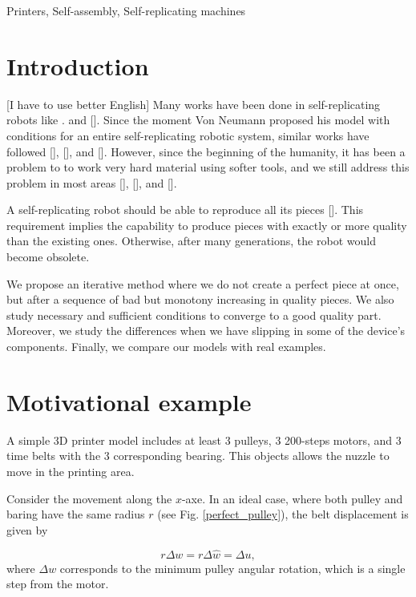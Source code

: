 \documentclass[conference]{IEEEtran}
\begin{document}
\begin{IEEEkeywords}
Printers, Self-assembly, Self-replicating machines
\end{IEEEkeywords}

\section{Introduction}

{\color{red}[I have to use better English]} Many works have been done in self-replicating robots like \cite{b1}. and []. Since the moment Von Neumann proposed his model with conditions for an entire self-replicating robotic system, similar works have followed [], [], and []. However, since the beginning of the humanity, it has been a problem  to to work very hard material using softer tools, and we still address this problem in most areas [], [], and [].

A self-replicating robot should be able to reproduce all its pieces []. This requirement implies the capability to produce pieces with exactly or more quality than the existing ones. Otherwise, after many generations, the robot would become obsolete.

We propose an iterative method where we do not create a perfect piece at once, but after a sequence of bad but monotony increasing in quality pieces. We also study necessary and sufficient conditions to converge to a good quality part. Moreover, we study the differences when we have slipping in some of the device's components. Finally, we compare our models with real examples.

\section{Motivational example} \label{Sec2}

A simple 3D printer model includes at least 3 pulleys, 3 200-steps motors, and 3 time belts with the 3 corresponding bearing. This objects allows the nuzzle to move in the printing area.

Consider the movement along the $x$-axe. In an ideal case, where both pulley and baring have the same radius $r$ (see Fig. \ref{perfect_pulley}), the belt displacement is given by

\begin{equation}
r\Delta w=r\Delta\hat{w}=\Delta u,
\label{eq:ideal}
\end{equation}
where $\Delta w$ corresponds to the minimum pulley angular rotation, which is a single step from the motor.
\end{document}
